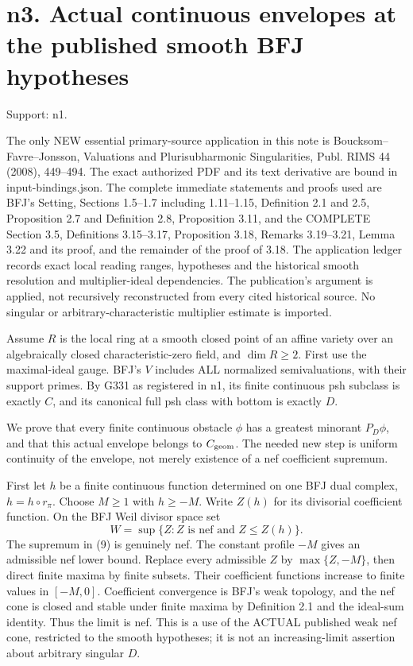 \documentclass[11pt]{article}
\begin{document}
\section{n3. Actual continuous envelopes at the published smooth BFJ hypotheses}

Support: n1.

The only NEW essential primary-source application in this note is Boucksom--Favre--Jonsson, Valuations and Plurisubharmonic Singularities, Publ. RIMS 44 (2008), 449--494. The exact authorized PDF and its text derivative are bound in input-bindings.json. The complete immediate statements and proofs used are BFJ's Setting, Sections 1.5--1.7 including 1.11--1.15, Definition 2.1 and 2.5, Proposition 2.7 and Definition 2.8, Proposition 3.11, and the COMPLETE Section 3.5, Definitions 3.15--3.17, Proposition 3.18, Remarks 3.19--3.21, Lemma 3.22 and its proof, and the remainder of the proof of 3.18. The application ledger records exact local reading ranges, hypotheses and the historical smooth resolution and multiplier-ideal dependencies. The publication's argument is applied, not recursively reconstructed from every cited historical source. No singular or arbitrary-characteristic multiplier estimate is imported.

Assume \(R\) is the local ring at a smooth closed point of an affine variety over an algebraically closed characteristic-zero field, and \(\dim R\ge2\). First use the maximal-ideal gauge. BFJ's \(V\) includes ALL normalized semivaluations, with their support primes. By G331 as registered in n1, its finite continuous psh subclass is exactly \(C\), and its canonical full psh class with bottom is exactly \(D\).

We prove that every finite continuous obstacle \(\phi\) has a greatest minorant \(P_D\phi\), and that this actual envelope belongs to \(C_{\rm geom}\). The needed new step is uniform continuity of the envelope, not merely existence of a nef coefficient supremum.

First let \(h\) be a finite continuous function determined on one BFJ dual complex, \(h=h\circ r_\pi\). Choose \(M\ge1\) with \(h\ge-M\). Write \(Z(h)\) for its divisorial coefficient function. On the BFJ Weil divisor space set
\[
W=\sup\{Z: Z\text{ is nef and }Z\le Z(h)\}. \tag{9}
\]
The supremum in (9) is genuinely nef. The constant profile \(-M\) gives an admissible nef lower bound. Replace every admissible \(Z\) by \(\max\{Z,-M\}\), then direct finite maxima by finite subsets. Their coefficient functions increase to finite values in \([-M,0]\). Coefficient convergence is BFJ's weak topology, and the nef cone is closed and stable under finite maxima by Definition 2.1 and the ideal-sum identity. Thus the limit is nef. This is a use of the ACTUAL published weak nef cone, restricted to the smooth hypotheses; it is not an increasing-limit assertion about arbitrary singular \(D\).
\end{document}
